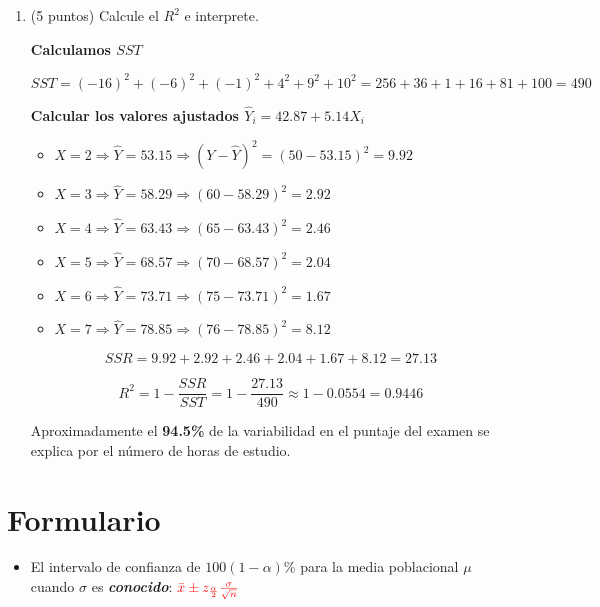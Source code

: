\documentclass[10pt,a4paper]{article}
\begin{document}
\begin{enumerate}
\begin{enumerate}
{\[
\Delta \hat{Y} = 5.14 \cdot 2 = 10.28
\]
}

\item (5 puntos) Calcule el $R^2$ e interprete.

{\color{blue} 


\textbf{Calculamos  \( SST \)}

\[
SST = (-16)^2 + (-6)^2 + (-1)^2 + 4^2 + 9^2 + 10^2 = 256 + 36 + 1 + 16 + 81 + 100 = 490
\]

\textbf{ Calcular los valores ajustados \( \hat{Y}_i = 42.87 + 5.14 X_i \)}

\begin{itemize}
    \item \( X = 2 \Rightarrow \hat{Y} = 53.15 \Rightarrow (Y - \hat{Y})^2 = (50 - 53.15)^2 = 9.92 \)
    \item \( X = 3 \Rightarrow \hat{Y} = 58.29 \Rightarrow (60 - 58.29)^2 = 2.92 \)
    \item \( X = 4 \Rightarrow \hat{Y} = 63.43 \Rightarrow (65 - 63.43)^2 = 2.46 \)
    \item \( X = 5 \Rightarrow \hat{Y} = 68.57 \Rightarrow (70 - 68.57)^2 = 2.04 \)
    \item \( X = 6 \Rightarrow \hat{Y} = 73.71 \Rightarrow (75 - 73.71)^2 = 1.67 \)
    \item \( X = 7 \Rightarrow \hat{Y} = 78.85 \Rightarrow (76 - 78.85)^2 = 8.12 \)
\end{itemize}

\[
SSR = 9.92 + 2.92 + 2.46 + 2.04 + 1.67 + 8.12 = 27.13
\]


\[
R^2 = 1 - \frac{SSR}{SST} = 1 - \frac{27.13}{490} \approx 1 - 0.0554 = 0.9446
\]

 Aproximadamente el \textbf{94.5\%} de la variabilidad en el puntaje del examen se explica por el número de horas de estudio. 

}
\end{enumerate} 



    
\section{Formulario}
\begin{itemize}

\item El intervalo de confianza de $100(1-\alpha)\%$ para la media poblacional $\mu$ cuando $\sigma$ es \emph{\textbf{conocido}}:
$\color{red}{\bar{x} \pm z_{\frac{\alpha}{2}}\frac{\sigma}{\sqrt{n}}}$


\end{itemize}
\end{enumerate}
\end{document}
